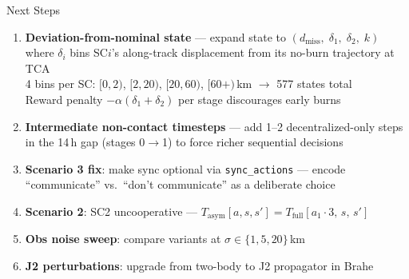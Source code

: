\documentclass[aspectratio=169]{beamer}
\begin{document}
\begin{frame}{Next Steps}
  \begin{enumerate}
    \item \textbf{Deviation-from-nominal state} --- expand state to
          $(d_\text{miss},\; \delta_1,\; \delta_2,\; k)$ where $\delta_i$ bins
          SC$i$'s along-track displacement from its no-burn trajectory at TCA\\
          \small 4 bins per SC: $[0,2)$, $[2,20)$, $[20,60)$, $[60+)$\,km $\rightarrow$ 577 states total\\
          Reward penalty $-\alpha(\delta_1 + \delta_2)$ per stage discourages early burns
    \vspace{0.2em}
    \item \textbf{Intermediate non-contact timesteps} --- add 1--2 decentralized-only
          steps in the 14\,h gap (stages 0$\rightarrow$1) to force richer sequential decisions
    \vspace{0.2em}
    \item \textbf{Scenario 3 fix}: make sync optional via \texttt{sync\_actions} ---
          encode ``communicate'' vs.\ ``don't communicate'' as a deliberate choice
    \vspace{0.2em}
    \item \textbf{Scenario 2}: SC2 uncooperative ---
          $T_\text{asym}[a,s,s'] = T_\text{full}[a_1 \cdot 3,\, s,\, s']$
    \vspace{0.2em}
    \item \textbf{Obs noise sweep}: compare variants at $\sigma \in \{1, 5, 20\}$\,km
    \vspace{0.2em}
    \item \textbf{J2 perturbations}: upgrade from two-body to J2 propagator in Brahe
  \end{enumerate}
\end{frame}
\end{document}
